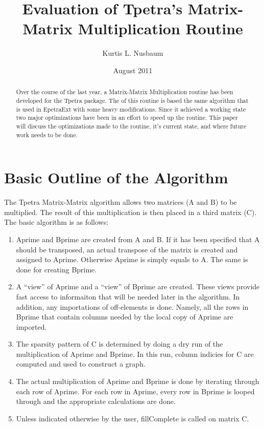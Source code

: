 \documentclass{article}
\title{Evaluation of Tpetra's Matrix-Matrix Multiplication Routine}
\author{Kurtis L. Nusbaum}
\date{August 2011}
\begin{document}
\maketitle

\begin{abstract}
Over the course of the last year, a Matrix-Matrix Multiplication routine has been developed for the Tpetra package.
The of this routine is based the same algorithm that is used in EpetraExt with some heavy modifications. Since it 
achieved a working state two major optimizations have been in an effort to speed up the routine. This paper will
discuss the optimizations made to the routine, it's current state, and where future work needs to be done.
\end{abstract}
\clearpage
\tableofcontents
\clearpage

\section{Basic Outline of the Algorithm}
The Tpetra Matrix-Matrix algorithm allows two matrices (A and B) to be multiplied. The result of this multiplication is then placed in a third matrix (C).
The basic algorithm is as follows:
\begin{enumerate}
  \item Aprime and Bprime are created from A and B. If it has been specified that A should be transposed, an actual transpose of the matrix is created
  and assigned to Aprime. Otherwise Aprime is simply equals to A. The same is done for creating Bprime.
  \item A ``view'' of Aprime and a ``view'' of Bprime are created. These views provide fast access to informaiton that will be needed later in the
  algorithm. In addition, any importations of off-elements is done. Namely, all the rows in Bprime that contain columns needed by the local copy of
  Aprime are imported.
  \item The sparsity pattern of C is determined by doing a dry run of the multiplication of Aprime and Bprime. In this run, column indicies for 
  C are computed and used to construct a graph.
  \item The actual multiplication of Aprime and Bprime is done by iterating through each row of Aprime. For each row in Aprime, every row in Bprime is
  looped through and the appropriate calculations are done.
  \item Unless indicated otherwise by the user, fillComplete is called on matrix C.
\end{enumerate}
\end{document}
